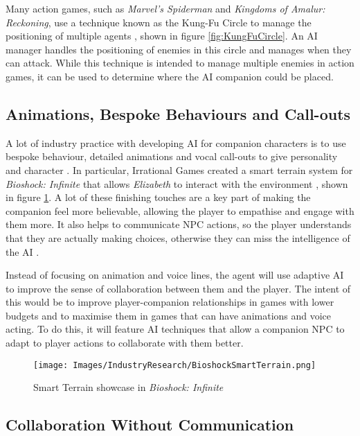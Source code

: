 \documentclass{IEEEtran}
\begin{document}
Many action games, such as \textit{Marvel's Spiderman} and \textit{Kingdoms of Amalur: Reckoning}, use a technique known as the Kung-Fu Circle to manage the positioning of multiple agents \cite{GAIPKungFuCircle, GDCSpiderman}, shown in figure \ref{fig:KungFuCircle}. An AI manager handles the positioning of enemies in this circle and manages when they can attack. While this technique is intended to manage multiple enemies in action games, it can be used to determine where the AI companion could be placed.

\subsection{Animations, Bespoke Behaviours and Call-outs}
\label{ABC}

A lot of industry practice with developing AI for companion characters is to use bespoke behaviour, detailed animations and vocal call-outs to give personality and character \cite{GAIP2EllieAI, GMTGoodAI, GAIPOReactions}. In particular, Irrational Games created a smart terrain system for \textit{Bioshock: Infinite} that allows \textit{Elizabeth} to interact with the environment \cite{GDCElizabeth, AIGamesBioshockAI}, shown in figure \ref{fig:BioshockSmartTerrain}. A lot of these finishing touches are a key part of making the companion feel more believable, allowing the player to empathise and engage with them more. It also helps to communicate NPC actions, so the player understands that they are actually making choices, otherwise they can miss the intelligence of the AI \cite{GMTGoodAI}.

Instead of focusing on animation and voice lines, the agent will use adaptive AI to improve the sense of collaboration between them and the player. The intent of this would be to improve player-companion relationships in games with lower budgets and to maximise them in games that can have animations and voice acting. To do this, it will feature AI techniques that allow a companion NPC to adapt to player actions to collaborate with them better.

\begin{figure}
  \centering
  \texttt{[image: Images/IndustryResearch/BioshockSmartTerrain.png]}
  
\caption{Smart Terrain showcase in \textit{Bioshock: Infinite}}
\label{fig:BioshockSmartTerrain}
\end{figure}

\subsection{Collaboration Without Communication}
\label{Communication}
\end{document}
